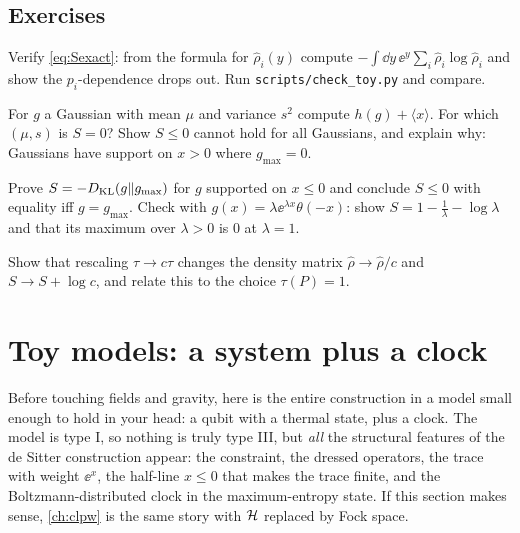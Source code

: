\subsection*{Exercises}
\begin{exercise}\label{ex:entropy_II:1}
Verify \eqref{eq:Sexact}: from the formula for $\hat\rho_i(y)$ compute $-\int\dd y\,\ee^y\sum_i\hat\rho_i\log\hat\rho_i$ and show the $p_i$-dependence drops out. Run \texttt{scripts/check\_toy.py} and compare.
\end{exercise}
\begin{exercise}\label{ex:entropy_II:2}
For $g$ a Gaussian with mean $\mu$ and variance $s^2$ compute $h(g)+\langle x\rangle$. For which $(\mu,s)$ is $S=0$? Show $S\le0$ cannot hold for all Gaussians, and explain why: Gaussians have support on $x>0$ where $g_{\max}=0$.
\end{exercise}
\begin{exercise}\label{ex:entropy_II:3}
Prove $S=-D_{\rm KL}(g\|g_{\max})$ for $g$ supported on $x\le0$ and conclude $S\le0$ with equality iff $g=g_{\max}$. Check with $g(x)=\lambda\ee^{\lambda x}\theta(-x)$: show $S=1-\frac1\lambda-\log\lambda$ and that its maximum over $\lambda>0$ is $0$ at $\lambda=1$.
\end{exercise}
\begin{exercise}\label{ex:entropy_II:4}
Show that rescaling $\tau\to c\tau$ changes the density matrix $\hat\rho\to\hat\rho/c$ and $S\to S+\log c$, and relate this to the choice $\tau(P)=1$.
\end{exercise}

\section{Toy models: a system plus a clock}\label{ch:toy_clock}

\begin{physmotiv}
Before touching fields and gravity, here is the entire construction in a model small enough to hold in your head: a qubit with a thermal state, plus a clock. The model is type I, so nothing is truly type III, but \emph{all} the structural features of the de Sitter construction appear: the constraint, the dressed operators, the trace with weight $\ee^{x}$, the half-line $x\le0$ that makes the trace finite, and the Boltzmann-distributed clock in the maximum-entropy state. If this section makes sense, \cref{ch:clpw} is the same story with $\mathcal{H}$ replaced by Fock space.
\end{physmotiv}

